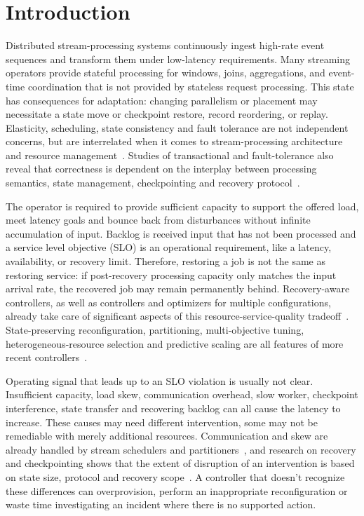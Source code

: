 \documentclass[journal]{IEEEtran}
\providecommand{\IEEEPARstart}[2]{#1#2}
\begin{document}
\section{Introduction}
\label{sec:introduction}
\IEEEPARstart{D}{istributed} stream-processing systems continuously ingest high-rate event sequences and transform them under low-latency requirements. Many streaming operators provide stateful processing for windows, joins, aggregations, and event-time coordination that is not provided by stateless request processing. This state has consequences for adaptation: changing parallelism or placement may necessitate a state move or checkpoint restore, record reordering, or replay. Elasticity, scheduling, state consistency and fault tolerance are not independent concerns, but are interrelated when it comes to stream-processing architecture and resource management~\cite{liu2020resource,cardellini2022adaptation,fragkoulis2024evolution}. Studies of transactional and fault-tolerance also reveal that correctness is dependent on the interplay between processing semantics, state management, checkpointing and recovery protocol~\cite{wang2021faulttolerance,zhang2023transactional}.

The operator is required to provide sufficient capacity to support the offered load, meet latency goals and bounce back from disturbances without infinite accumulation of input. Backlog is received input that has not been processed and a service level objective (SLO) is an operational requirement, like a latency, availability, or recovery limit. Therefore, restoring a job is not the same as restoring service: if post-recovery processing capacity only matches the input arrival rate, the recovered job may remain permanently behind. Recovery-aware controllers, as well as controllers and optimizers for multiple configurations, already take care of significant aspects of this resource-service-quality tradeoff~\cite{geldenhuys2022phoebe,geldenhuys2024demeter}. State-preserving reconfiguration, partitioning, multi-objective tuning, heterogeneous-resource selection and predictive scaling are all features of more recent controllers~\cite{pfister2024daedalus,russorusso2023hierarchical,pedratscher2025streamline,liu2026scarf}.

Operating signal that leads up to an SLO violation is usually not clear. Insufficient capacity, load skew, communication overhead, slow worker, checkpoint interference, state transfer and recovering backlog can all cause the latency to increase. These causes may need different intervention, some may not be remediable with merely additional resources. Communication and skew are already handled by stream schedulers and partitioners~\cite{wu2025msstream,fan2026rastream,ren2026sapdpo}, and research on recovery and checkpointing shows that the extent of disruption of an intervention is based on state size, protocol and recovery scope~\cite{theodorakis2021scabbard,siachamis2024checkmate,takdir2025localrecovery,qing2025drrs}. A controller that doesn't recognize these differences can overprovision, perform an inappropriate reconfiguration or waste time investigating an incident where there is no supported action.
\end{document}
